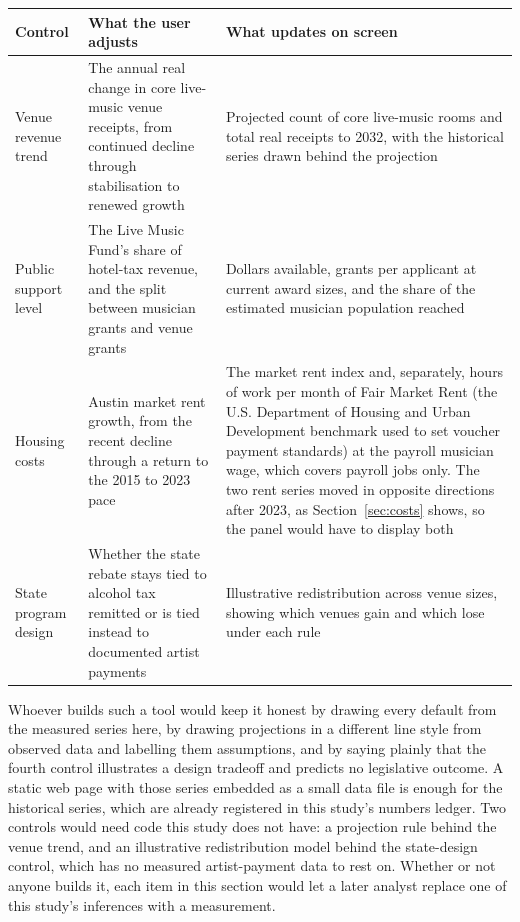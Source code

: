 \begin{center}
\footnotesize
\begin{tabular}{@{}B{2.9cm} P{7.2cm} P{5.5cm}@{}}
\toprule
\textbf{Control} & \textbf{What the user adjusts} & \textbf{What updates on screen} \\
\midrule
Venue revenue trend & The annual real change in core live-music venue receipts,
from continued decline through stabilisation to renewed growth &
Projected count of core live-music rooms and total real receipts to 2032, with
the historical series drawn behind the projection \\
\rowrule
Public support level & The Live Music Fund's share of hotel-tax revenue, and
the split between musician grants and venue grants &
Dollars available, grants per applicant at current award sizes, and the share
of the estimated musician population reached \\
\rowrule
Housing costs & Austin market rent growth, from the recent decline through a
return to the 2015 to 2023 pace &
The market rent index and, separately, hours of work per month of Fair Market
Rent (the U.S. Department of Housing and Urban Development benchmark used to
set voucher payment standards) at the payroll musician wage, which covers
payroll jobs only. The two rent series moved in opposite directions after
2023, as Section~\ref{sec:costs} shows, so the panel would have to display
both \\
\rowrule
State program design & Whether the state rebate stays tied to alcohol tax
remitted or is tied instead to documented artist payments &
Illustrative redistribution across venue sizes, showing which venues gain and
which lose under each rule \\
\bottomrule
\end{tabular}
\end{center}

\vspace{3pt}
{\footnotesize Whoever builds such a tool would keep it honest by drawing
every default from the measured series here, by drawing projections in a
different line style from observed data and labelling them assumptions, and
by saying plainly that the fourth control illustrates a design tradeoff and
predicts no legislative outcome. A static web page with those series embedded
as a small data file is enough for the historical series, which are already
registered in this study's numbers ledger. Two controls would need
code this study does not have: a projection rule behind the venue trend, and
an illustrative redistribution model behind the state-design control, which
has no measured artist-payment data to rest on.
Whether or not anyone builds it, each item in this section would let a later
analyst replace one of this study's inferences with a measurement.}
